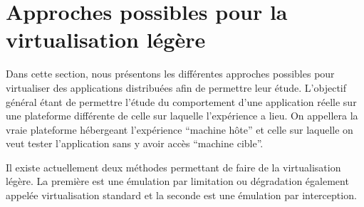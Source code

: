 \section{Approches possibles pour la virtualisation légère}
\label{section:emulation}

Dans cette section, nous présentons les différentes approches possibles pour virtualiser des applications distribuées afin de permettre leur étude. L'objectif général étant de permettre l'étude du comportement d'une application réelle sur une plateforme différente de celle sur laquelle l'expérience a lieu. On appellera la vraie plateforme hébergeant l'expérience ``machine hôte'' et celle sur laquelle on veut tester l'application sans y avoir accès ``machine cible''.

Il existe actuellement deux méthodes permettant de faire de la virtualisation
légère. La première est une émulation par limitation ou dégradation également
appelée virtualisation standard et la seconde est une émulation par
interception.









